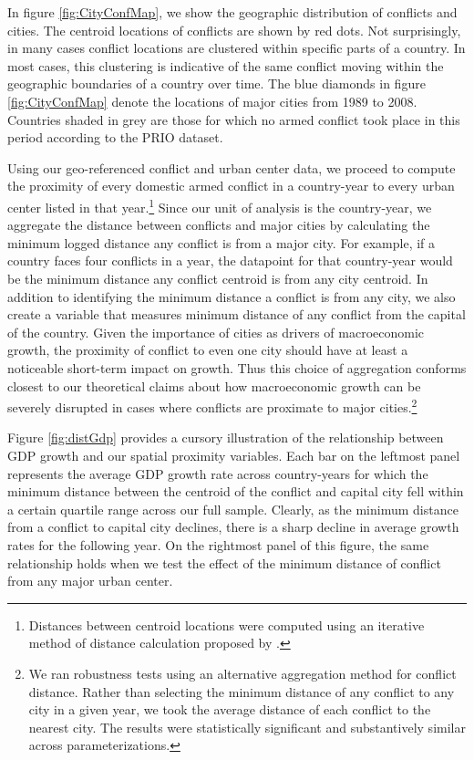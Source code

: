 In figure \ref{fig:CityConfMap}, we show the geographic distribution of conflicts and cities. The centroid locations of conflicts are shown by red dots. Not surprisingly, in many cases conflict locations are clustered within specific parts of a country. In most cases, this clustering is indicative of the same conflict moving within the geographic boundaries of a country over time. The blue diamonds in figure \ref{fig:CityConfMap} denote the locations of major cities from 1989 to 2008. Countries shaded in grey are those for which no armed conflict took place in this period according to the PRIO dataset.  

Using our geo-referenced conflict and urban center data, we proceed to compute the proximity of every domestic armed conflict in a country-year to every urban center listed in that year.\footnote{Distances between centroid locations were computed using an iterative method of distance calculation proposed by \citet{vincenty:1975}.} Since our unit of analysis is the country-year, we aggregate the distance between conflicts and major cities by calculating the minimum logged distance any conflict is from a major city. For example, if a country faces four conflicts in a year, the datapoint for that country-year would be the minimum distance any conflict centroid is from any city centroid. In addition to identifying the minimum distance a conflict is from any city, we also create a variable that measures minimum distance of any conflict from the capital of the country. Given the importance of cities as drivers of macroeconomic growth, the proximity of conflict to even one city should have at least a noticeable short-term impact on growth. Thus this choice of aggregation conforms closest to our theoretical claims about how macroeconomic growth can be severely disrupted in cases where conflicts are proximate to major cities.\footnote{We ran robustness tests using an alternative aggregation method for conflict distance. Rather than selecting the minimum distance of any conflict to any city in a given year, we took the average distance of each conflict to the nearest city. The results were statistically significant and substantively similar across parameterizations.}

Figure \ref{fig:distGdp} provides a cursory illustration of the relationship between GDP growth and our spatial proximity variables. Each bar on the leftmost panel represents the average GDP growth rate across country-years for which the minimum distance between the centroid of the conflict and capital city fell within a certain quartile range across our full sample. Clearly, as the minimum distance from a conflict to capital city declines, there is a sharp decline in average growth rates for the following year. On the rightmost panel of this figure, the same relationship holds when we test the effect of the minimum distance of conflict from any major urban center. 

